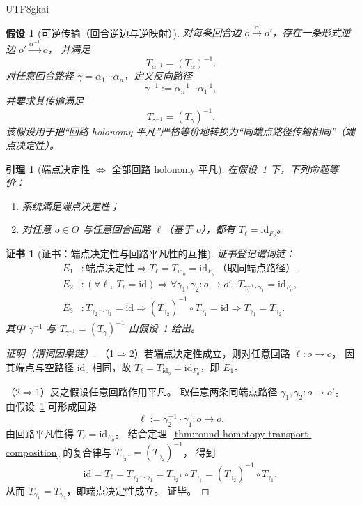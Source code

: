 \documentclass[12pt]{article}
\newtheorem{assumption}{假设}[section]
\newtheorem{lemma}{引理}[section]
\newtheorem{Certificate}{证书}[section]
\begin{document}
\begin{CJK*}{UTF8}{gkai}
\begin{assumption}[可逆传输（回合逆边与逆映射）]
\label{asm:round-homotopy-invertible-transport}
对每条回合边 $o\xrightarrow{\alpha}o'$，存在一条形式逆边 $o'\xrightarrow{\alpha^{-1}}o$，
并满足
\[
  T_{\alpha^{-1}}=(T_{\alpha})^{-1}.
\]
对任意回合路径 $\gamma=\alpha_1\cdots\alpha_n$，定义反向路径
\[
  \gamma^{-1}:=\alpha_n^{-1}\cdots\alpha_1^{-1},
\]
并要求其传输满足
\[
  T_{\gamma^{-1}}=(T_{\gamma})^{-1}.
\]
该假设用于把“回路 holonomy 平凡”严格等价地转换为“同端点路径传输相同”（端点决定性）。
\end{assumption}

\begin{lemma}[端点决定性 $\Longleftrightarrow$ 全部回路 holonomy 平凡]
\label{lem:round-homotopy-endpoint-iff-trivial-holonomy}
在假设~\ref{asm:round-homotopy-invertible-transport} 下，下列命题等价：
\begin{enumerate}
  \item 系统满足端点决定性；
  \item 对任意 $o\in O$ 与任意回合回路 $\ell$（基于 $o$），都有 $T_{\ell}=\mathrm{id}_{F_o}$。
\end{enumerate}
\end{lemma}

\begin{Certificate}[证书：端点决定性与回路平凡性的互推]
\label{cert:round-homotopy-endpoint-iff-trivial-holonomy}
证书登记谓词链：
\[
\begin{aligned}
  E_1 &: \text{端点决定性}\Rightarrow T_{\ell}=T_{\mathrm{id}_o}=\mathrm{id}_{F_o}\ \text{（取同端点路径）},\\
  E_2 &: (\forall \ell,\ T_{\ell}=\mathrm{id})\Rightarrow \forall \gamma_1,\gamma_2:o\to o',\ T_{\gamma_2^{-1}
    \cdot\gamma_1}=\mathrm{id}_{F_o},\\
  E_3 &: T_{\gamma_2^{-1}\cdot\gamma_1}=\mathrm{id}\Rightarrow (T_{\gamma_2})^{-1}\circ T_{\gamma_1}=\mathrm{id}
    \Rightarrow T_{\gamma_1}=T_{\gamma_2}.
\end{aligned}
\]
其中 $\gamma^{-1}$ 与 $T_{\gamma^{-1}}=(T_{\gamma})^{-1}$ 由假设~\ref{asm:round-homotopy-invertible-transport} 给出。
\end{Certificate}

\begin{proof}[证明（谓词因果链）]
（1$\Rightarrow$2）若端点决定性成立，则对任意回路 $\ell:o\to o$，
因其端点与空路径 $\mathrm{id}_o$ 相同，故 $T_{\ell}=T_{\mathrm{id}_o}=\mathrm{id}_{F_o}$，即 $E_1$。

（2$\Rightarrow$1）反之假设任意回路作用平凡。
取任意两条同端点路径 $\gamma_1,\gamma_2:o\to o'$。
由假设~\ref{asm:round-homotopy-invertible-transport} 可形成回路
\[
  \ell:=\gamma_2^{-1}\cdot\gamma_1:o\to o.
\]
由回路平凡性得 $T_{\ell}=\mathrm{id}_{F_o}$。
结合定理~\ref{thm:round-homotopy-transport-composition} 的复合律与 $T_{\gamma_2^{-1}}=(T_{\gamma_2})^{-1}$，
得到
\[
  \mathrm{id}=T_{\ell}=T_{\gamma_2^{-1}\cdot\gamma_1}=T_{\gamma_2^{-1}}\circ T_{\gamma_1}=(T_{\gamma_2})^{-1}\circ
    T_{\gamma_1},
\]
从而 $T_{\gamma_1}=T_{\gamma_2}$，即端点决定性成立。
证毕。
\end{proof}


\end{CJK*}
\end{document}
